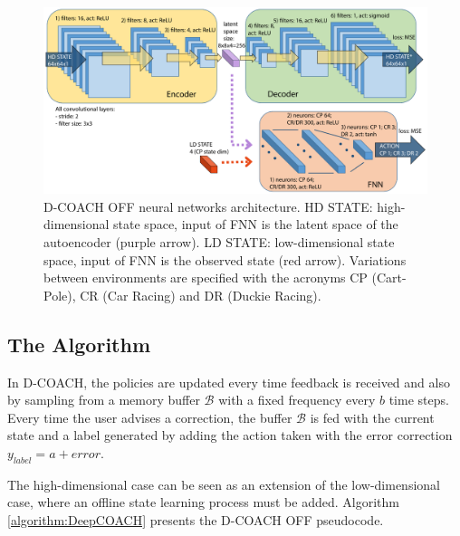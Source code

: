 \begin{figure}[h]
    \centering
    \includegraphics[width=0.9\linewidth]{imagenes/cap2/ISER_diagram.pdf}
    \caption{D-COACH OFF neural networks architecture. HD STATE: high-dimensional state space, input of FNN is the latent space of the autoencoder (purple arrow). LD STATE: low-dimensional state space, input of FNN is the observed state (red arrow). Variations between environments are specified with the acronyms CP (Cart-Pole), CR (Car Racing) and DR (Duckie Racing). }
    \label{fig:network_diagram}
\end{figure}

\subsection{The Algorithm}
In D-COACH, the policies are updated every time feedback is received and also by sampling from a memory buffer $\mathcal{B}$ with a fixed frequency every $b$ time steps. Every time the user advises a correction, the buffer $\mathcal{B}$ is fed with the current state and a label generated by adding the action taken with the error correction $y_{label}=a+\mathit{error}$.

The high-dimensional case can be seen as an extension of the low-dimensional case, where an offline state learning process must be added. Algorithm \ref{algorithm:DeepCOACH} presents the D-COACH OFF pseudocode.

